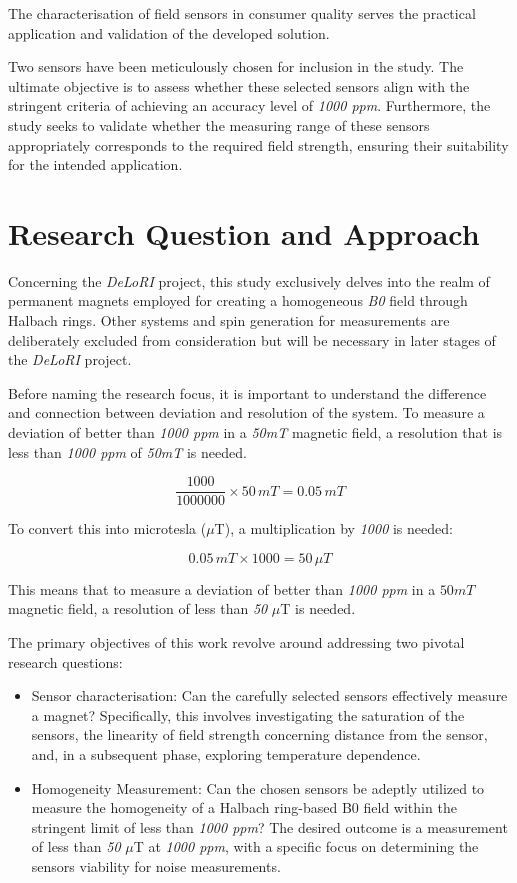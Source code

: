 The characterisation of field sensors in consumer quality serves the
practical application and validation of the developed solution.

Two sensors have been meticulously chosen for inclusion in the study.
The ultimate objective is to assess whether these selected sensors align
with the stringent criteria of achieving an accuracy level of \emph{1000
\gls{ppm}}. Furthermore, the study seeks to validate whether the
measuring range of these sensors appropriately corresponds to the
required field strength, ensuring their suitability for the intended
application.

\hypertarget{research-question-and-approach}{%
\section{Research Question and
Approach}\label{research-question-and-approach}}

Concerning the \emph{DeLoRI} project, this study exclusively delves into
the realm of permanent magnets employed for creating a homogeneous
\emph{B0} field through Halbach rings. Other systems and spin generation
for measurements are deliberately excluded from consideration but will
be necessary in later stages of the \emph{DeLoRI} project.

Before naming the research focus, it is important to understand the
difference and connection between deviation and resolution of the
system. To measure a deviation of better than \emph{1000 \gls{ppm}} in a
\emph{50mT} magnetic field, a resolution that is less than \emph{1000
\gls{ppm}} of \emph{50mT} is needed.

\[\frac{1000}{1000000} \times 50 \, mT = 0.05 \, mT \]

To convert this into microtesla (\(\mu\)T), a multiplication by
\emph{1000} is needed:

\[ 0.05 \, mT \times 1000 = 50 \, \mu T \]

This means that to measure a deviation of better than \emph{1000
\gls{ppm}} in a \(50mT\) magnetic field, a resolution of less than
\emph{50} \(\mu\)T is needed.

The primary objectives of this work revolve around addressing two
pivotal research questions:

\begin{itemize}
\item
  Sensor characterisation: Can the carefully selected sensors
  effectively measure a magnet? Specifically, this involves
  investigating the saturation of the sensors, the linearity of field
  strength concerning distance from the sensor, and, in a subsequent
  phase, exploring temperature dependence.
\item
  Homogeneity Measurement: Can the chosen sensors be adeptly utilized to
  measure the homogeneity of a Halbach ring-based B0 field within the
  stringent limit of less than \emph{1000 \gls{ppm}}? The desired
  outcome is a measurement of less than \emph{50} \(\mu\)T at \emph{1000
  \gls{ppm}}, with a specific focus on determining the sensors viability
  for noise measurements.
\end{itemize}

